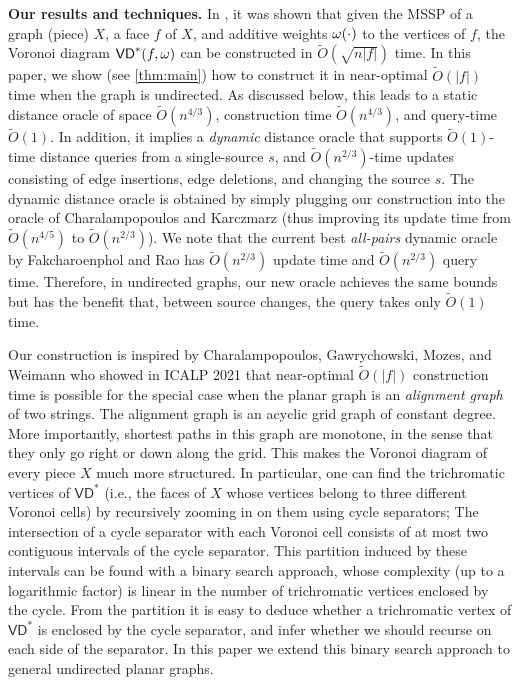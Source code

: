 \documentclass{article}
\newcommand{\VD}{\textsf{VD}}
\newcommand{\weight}{{\rm \omega}}
\newcommand{\X}{X}
\begin{document}
\medskip
\noindent
{\bf Our results and techniques.}
In \cite{ourJACM}, it was shown that  given the MSSP of a graph (piece) $\X$, a face $f$ of $\X$, and additive weights $\weight (\cdot)$ to the vertices of $f$, the Voronoi diagram $\VD^*(f,\weight)$ can be constructed in $\tilde O(\sqrt{n |f|})$ time.
In this paper, we show (see \cref{thm:main}) how to construct it in near-optimal $\tilde O(|f|)$ time when the graph is undirected.
As discussed below, this leads to a static distance oracle of space $\tilde O(n^{4/3})$, construction time $\tilde O(n^{4/3})$, and query-time $\tilde O(1)$.
In addition, it implies a {\em dynamic} distance oracle that supports $\tilde O(1)$-time distance queries from a single-source $s$, and $\tilde O(n^{2/3})$-time updates consisting of edge insertions, edge deletions, and  changing the source $s$.
The dynamic distance oracle is obtained by simply plugging  our construction into the oracle of Charalampopoulos and Karczmarz \cite{Panos} (thus improving its update time from $\tilde O(n^{4/5})$ to $\tilde O(n^{2/3})$). We note that the current best {\em all-pairs} dynamic oracle by   Fakcharoenphol and Rao \cite{FakcharoenpholR06} has $\tilde O(n^{2/3})$ update time and $\tilde O(n^{2/3})$ query time. Therefore, in undirected graphs, our new oracle achieves the same bounds but has the benefit that, between source changes, the query takes only $\tilde O(1)$ time.


Our construction is inspired by Charalampopoulos, Gawrychowski, Mozes, and Weimann who showed in ICALP 2021 \cite{CharalampopoulosGM21}  that near-optimal $\tilde O(|f|)$ construction time is possible for the special case when the planar graph is an {\em alignment graph} of two strings.
The alignment graph is an acyclic grid graph of constant degree.
More importantly, shortest paths in this graph are monotone, in the sense that they only go right or down along the grid.
This makes the Voronoi diagram of every piece $\X$ much more structured.
In particular, one can find the trichromatic vertices of $\VD^*$ (i.e., the faces of $\X$ whose vertices belong to three different Voronoi cells) by recursively zooming in on them using cycle separators;
The intersection of a cycle separator with each Voronoi cell consists of at most two contiguous intervals of the cycle separator.
This partition induced by these intervals can be found with a binary search approach, whose complexity (up to a logarithmic factor) is linear in the number of trichromatic vertices enclosed by the cycle.
From the partition it is easy to deduce whether a trichromatic vertex of $\VD^*$ is enclosed by the cycle separator, and infer whether we should recurse on each side of the separator.
In this paper we extend this binary search approach to general undirected planar graphs.
\end{document}
